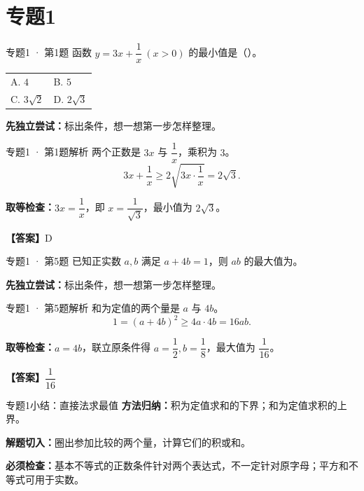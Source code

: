 \documentclass[UTF8,10pt,aspectratio=169]{ctexbeamer}
\makeatletter
\newcommand{\Answer}[1]{\par\vspace{0.2cm}\textbf{【答案】}#1}
\newcommand{\Choices}[4]{\par\vspace{0.2cm}\begin{tabular}{@{}p{0.47\textwidth}p{0.47\textwidth}@{}}A. #1 & B. #2 \\[0.15cm] C. #3 & D. #4\end{tabular}}
\makeatother
\begin{document}
\section{专题1}
\begin{frame}[t]{专题1 · 第1题}
函数 $y=3x+\dfrac1x\ (x>0)$ 的最小值是（\quad）。
\Choices{$4$}{$5$}{$3\sqrt2$}{$2\sqrt3$}
\par\vspace{0.3cm}\textbf{先独立尝试：}标出条件，想一想第一步怎样整理。
\end{frame}
\begin{frame}[t]{专题1 · 第1题解析}
两个正数是 $3x$ 与 $\dfrac{1}{x}$，乘积为 $3$。\[3x+\frac1x\ge2\sqrt{3x\cdot\frac1x}=2\sqrt3.\]
\pause
\par\vspace{0.2cm}\textbf{取等检查：}$3x=\dfrac{1}{x}$，即 $x=\dfrac{1}{\sqrt3}$，最小值为 $2\sqrt3$。
\Answer{D}
\end{frame}
\begin{frame}[t]{专题1 · 第5题}
已知正实数 $a,b$ 满足 $a+4b=1$，则 $ab$ 的最大值为\underline{\hspace{1.5cm}}。
\par\vspace{0.3cm}\textbf{先独立尝试：}标出条件，想一想第一步怎样整理。
\end{frame}
\begin{frame}[t]{专题1 · 第5题解析}
和为定值的两个量是 $a$ 与 $4b$。\[1=(a+4b)^2\ge4a\cdot4b=16ab.\]
\pause
\par\vspace{0.2cm}\textbf{取等检查：}$a=4b$，联立原条件得 $a=\dfrac{1}{2},b=\dfrac{1}{8}$，最大值为 $\dfrac{1}{16}$。
\Answer{$\dfrac{1}{16}$}
\end{frame}
\begin{frame}[t]{专题1小结：直接法求最值}
\textbf{方法归纳：}积为定值求和的下界；和为定值求积的上界。\par\vspace{0.4cm}
\textbf{解题切入：}圈出参加比较的两个量，计算它们的积或和。\par\vspace{0.4cm}
\textbf{必须检查：}基本不等式的正数条件针对两个表达式，不一定针对原字母；平方和不等式可用于实数。
\end{frame}
\end{document}
